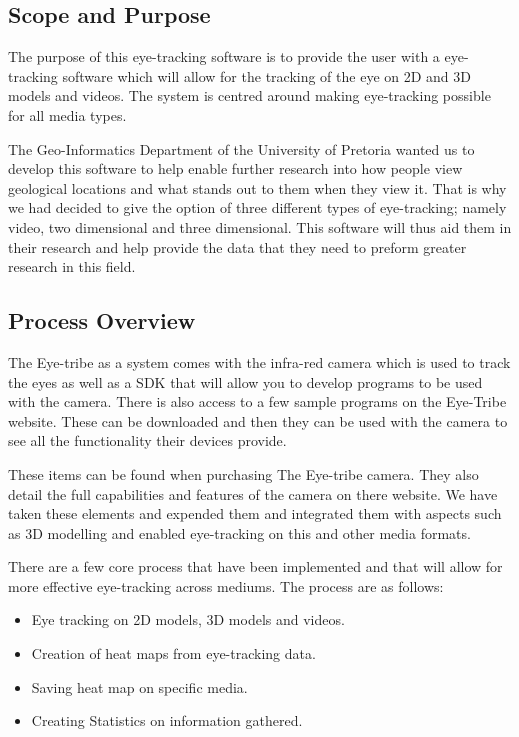 \subsection{Scope and Purpose}
The purpose of this eye-tracking software is to provide the user with a eye-tracking software which will allow for the tracking of the eye on 2D and 3D models and videos. The system is centred around making eye-tracking possible for all media types.

The Geo-Informatics Department of the University of Pretoria wanted us to develop this software to help enable further research into how people view geological locations and what stands out to them when they view it. That is why we had decided to give the option of three different types of eye-tracking; namely video, two dimensional and three dimensional. This software will thus aid them in their research and help provide the data that they need to preform greater research in this field.

\subsection{Process Overview }
The Eye-tribe as a system comes with the infra-red camera which is used to track the eyes as well as a SDK that will allow you to develop programs to be used with the camera. There is also access to a few sample programs on the Eye-Tribe website. These can be downloaded and then they can be used with the camera to see all the functionality their devices provide.

These items can be found when purchasing The Eye-tribe camera. They also detail the full capabilities and features of the camera on there website. We have taken these elements and expended them and integrated them with aspects such as 3D modelling and enabled eye-tracking on this and other media formats.

There are a few core process that have been implemented and that will allow for more effective eye-tracking across mediums. The process are as follows:
\begin{itemize}
\item Eye tracking on 2D models, 3D models and videos.
\item Creation of heat maps from eye-tracking data.
\item Saving heat map on specific media.
\item Creating Statistics on information gathered.
\end{itemize}

